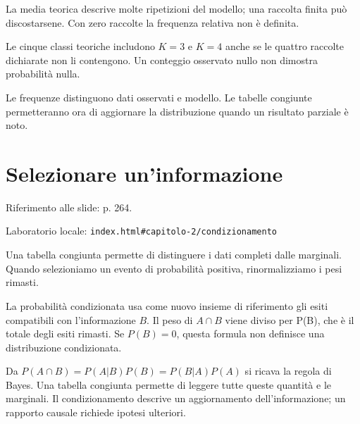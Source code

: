 La media teorica descrive molte ripetizioni del modello; una raccolta finita può discostarsene. Con zero raccolte la frequenza relativa non è definita.\par



Le cinque classi teoriche includono \(K=3\) e \(K=4\) anche se le quattro raccolte dichiarate non li contengono. Un conteggio osservato nullo non dimostra probabilità nulla.\par


Le frequenze distinguono dati osservati e modello. Le tabelle congiunte permetteranno ora di aggiornare la distribuzione quando un risultato parziale è noto.\par


\Needspace{.43\textheight}
\section{Selezionare un'informazione}
\label{c2-condizionamento}

{\sffamily\small\color{Ink!70} Riferimento alle slide: p. 264.\par}

{\sffamily\small\color{Ink!70} Laboratorio locale: \nolinkurl{index.html#capitolo-2/condizionamento}\par}

Una tabella congiunta permette di distinguere i dati completi dalle marginali. Quando selezioniamo un evento di probabilità positiva, rinormalizziamo i pesi rimasti.\par

La probabilità condizionata usa come nuovo insieme di riferimento gli esiti compatibili con l'informazione \(B\). Il peso di \(A\cap B\) viene diviso per P(B), che è il totale degli esiti rimasti. Se \(P(B)=0\), questa formula non definisce una distribuzione condizionata.\par

Da \(P(A\cap B)=P(A|B)P(B)=P(B|A)P(A)\) si ricava la regola di Bayes. Una tabella congiunta permette di leggere tutte queste quantità e le marginali. Il condizionamento descrive un aggiornamento dell'informazione; un rapporto causale richiede ipotesi ulteriori.\par



